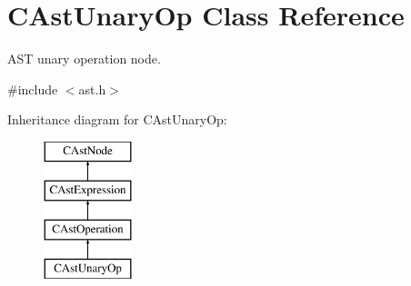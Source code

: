\hypertarget{classCAstUnaryOp}{\section{C\-Ast\-Unary\-Op Class Reference}
\label{classCAstUnaryOp}
}


A\-S\-T unary operation node.  




{\ttfamily \#include $<$ast.\-h$>$}

Inheritance diagram for C\-Ast\-Unary\-Op\-:\begin{figure}[H]
\begin{center}
\leavevmode
\includegraphics[height=4.000000cm]{classCAstUnaryOp}
\end{center}
\end{figure}
